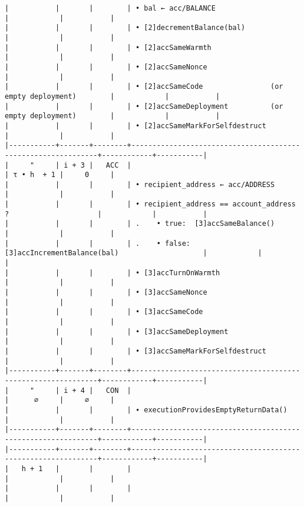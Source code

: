\documentclass[varwidth=\maxdimen,margin=0.5cm,multi={verbatim}]{standalone}
\begin{document}
\begin{verbatim}
|           |       |        | • bal ← acc/BALANCE                                          |            |           |
|           |       |        | • [2]decrementBalance(bal)                                   |            |           |
|           |       |        | • [2]accSameWarmth                                           |            |           |
|           |       |        | • [2]accSameNonce                                            |            |           |
|           |       |        | • [2]accSameCode                (or empty deployment)        |            |           |
|           |       |        | • [2]accSameDeployment          (or empty deployment)        |            |           |
|           |       |        | • [2]accSameMarkForSelfdestruct                              |            |           |
|-----------+-------+--------+--------------------------------------------------------------+------------+-----------|
|     "     | i + 3 |   ACC  |                                                              | τ • h  + 1 |     0     |
|           |       |        | • recipient_address ← acc/ADDRESS                            |            |           |
|           |       |        | • recipient_address == account_address ?                     |            |           |
|           |       |        | .    • true:  [3]accSameBalance()                            |            |           |
|           |       |        | .    • false: [3]accIncrementBalance(bal)                    |            |           |
|           |       |        | • [3]accTurnOnWarmth                                         |            |           |
|           |       |        | • [3]accSameNonce                                            |            |           |
|           |       |        | • [3]accSameCode                                             |            |           |
|           |       |        | • [3]accSameDeployment                                       |            |           |
|           |       |        | • [3]accSameMarkForSelfdestruct                              |            |           |
|-----------+-------+--------+--------------------------------------------------------------+------------+-----------|
|     "     | i + 4 |   CON  |                                                              |      ∅     |     ∅     |
|           |       |        | ∙ executionProvidesEmptyReturnData()                         |            |           |
|-----------+-------+--------+--------------------------------------------------------------+------------+-----------|
|-----------+-------+--------+--------------------------------------------------------------+------------+-----------|
|   h + 1   |       |        |                                                              |            |           |
|           |       |        |                                                              |            |           |
\end{verbatim}
\end{document}
